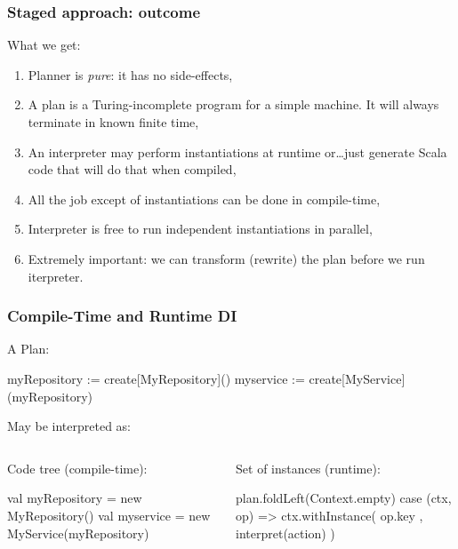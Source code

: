 \documentclass[usenames,dvipsnames]{beamer}
\begin{document}
\begin{frame}
\frametitle{Staged approach: outcome}
What we get:
\begin{enumerate}
\item Planner is \textit{pure}: it has no side-effects,
\item A plan is a Turing-incomplete program for a simple machine. It will always terminate in known finite time,
\item An interpreter may perform instantiations at runtime or\dots just generate Scala code that will do that when compiled,
\item All the job except of instantiations can be done in compile-time,
\item Interpreter is free to run independent instantiations in parallel,
\item Extremely important: we can transform (rewrite) the plan before we run iterpreter.
\end{enumerate}
\end{frame}

\begin{frame}[fragile]
\begin{center}
\frametitle{Compile-Time and Runtime DI}
A Plan:
\begin{textcode}
myRepository := create[MyRepository]()
myservice    := create[MyService](myRepository)
\end{textcode}

May be interpreted as:

\begin{columns}

\begin{column}[T]{0.5\textwidth}
   \setlength{\topsep}{0pt}
   \setlength{\partopsep}{0pt}
Code tree (compile-time):
\begin{scalacode}
val myRepository = 
    new MyRepository()
val myservice = 
    new MyService(myRepository)
\end{scalacode}
\end{column}

\begin{column}[T]{0.5\textwidth}
Set of instances (runtime):
\begin{scalacode}
plan.foldLeft(Context.empty) {
case (ctx, op) =>
    ctx.withInstance(
        op.key
        , interpret(action)
    )
}
\end{scalacode}
\end{column}

\end{columns}
\end{center}
\end{frame}
\end{document}
